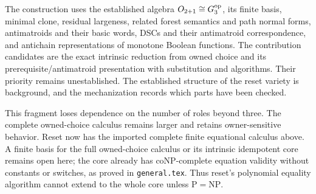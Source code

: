 \documentclass[11pt]{article}
\begin{document}
The construction uses the established algebra $O_{2+1}\cong G_3^{\rm op}$,
its finite basis, minimal clone, residual largeness, related forest
semantics and path normal forms, antimatroids and their basic words,
DSCs and their antimatroid correspondence, and antichain representations
of monotone Boolean functions. The contribution candidates are the exact
intrinsic reduction from owned choice and its prerequisite/antimatroid
presentation with substitution and algorithms. Their priority remains
unestablished. The established structure of the reset variety is
background, and the mechanization records which parts have been checked.

This fragment loses dependence on the number of roles beyond three.
The complete owned-choice calculus remains larger and retains
owner-sensitive behavior. Reset now has the imported complete finite
equational calculus above. A finite basis for the full owned-choice
calculus or its intrinsic idempotent core remains open here; the core
already has coNP-complete equation validity without constants or switches,
as proved in \texttt{general.tex}. Thus reset's polynomial equality
algorithm cannot extend to the whole core unless $\mathrm P=\mathrm{NP}$.



\end{document}
